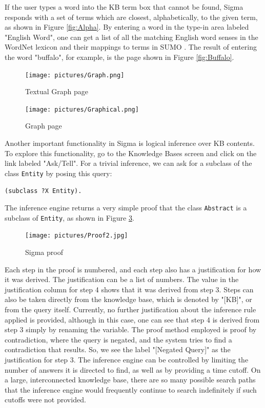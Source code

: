 \documentclass{book}
\begin{document}
If the user types a word into the KB term box that cannot be found, Sigma
responds with a set of terms which are closest, alphabetically, to the given
term, as shown in Figure \ref{fig:Alpha}. By entering a word in the type-in area
labeled "English Word", one can get a list of all the matching English word
senses in the WordNet lexicon and their mappings to terms in SUMO
\cite{np03}. The result of entering the word "buffalo", for
example, is the page shown in Figure \ref{fig:Buffalo}.

\begin{figure}
  \centering
  \texttt{[image: pictures/Graph.png]}
  \caption{Textual Graph page}
  \label{fig:Graph}
\end{figure}

\begin{figure}
  \centering
  \texttt{[image: pictures/Graphical.png]}
  \caption{Graph page}
  \label{fig:Graphical}
\end{figure}

Another important
functionality in Sigma is logical inference over KB contents.  To explore
this functionality, go to the Knowledge Bases screen and click on the link
labeled "Ask/Tell".  For a trivial inference, we can ask for a subclass of the
class {\tt Entity} by posing this query:

\begin{verbatim}
(subclass ?X Entity).
\end{verbatim}

The inference engine returns a very simple proof that the class {\tt Abstract} is a
subclass of {\tt Entity}, as shown in Figure \ref{fig:Proof}.

\begin{figure}
  \centering
  \texttt{[image: pictures/Proof2.jpg]}
  \caption{Sigma proof}
  \label{fig:Proof}
\end{figure}

Each step in the proof is numbered, and each step also has a justification for
how it was derived.  The justification can be a list of numbers.  The value in
the justification column for step 4 shows that it was derived from step 3.
Steps can also be taken directly from the knowledge base, which is denoted by
"[KB]", or from the query itself.  Currently, no further justification about
the inference rule applied is provided, although in this case, one can see that
step 4 is derived from step 3 simply by renaming the variable.  The proof method
employed is proof by contradiction, where the query is negated, and the system
tries to find a contradiction that results.  So, we see the label "[Negated
Query]" as the justification for step 3. The inference engine can be
controlled by limiting the number of answers it is directed to find, as well as
by providing a time cutoff.  On a large, interconnected knowledge base, there
are so many possible search paths that the inference engine would frequently
continue to search indefinitely if such cutoffs were not provided.
\end{document}
